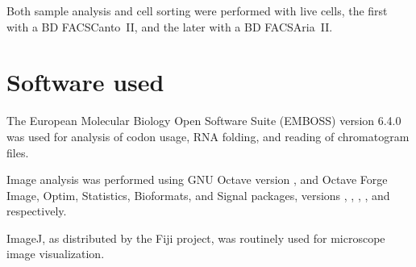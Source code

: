       Both sample analysis and cell sorting were performed with live cells, the
      first with a BD FACSCanto~II, and the later with a BD FACSAria~II.

  \section{Software used}
    \label{sec:methods:software}
    The European Molecular Biology Open Software Suite (EMBOSS) version 6.4.0
    was used for analysis of codon usage, RNA folding, and reading of
    chromatogram files.

    Image analysis was performed using GNU Octave version \OctaveVersion{},
    and Octave Forge Image, Optim, Statistics, Bioformats, and Signal
    packages, versions \OctaveImageVersion{}, \OctaveOptimVersion{},
    \OctaveStatisticsVersion{}, \OctaveBioformatsVersion{}, and
    \OctaveSignalVersion{} respectively.

    ImageJ, as distributed by the Fiji project, was routinely used
    for microscope image visualization.
